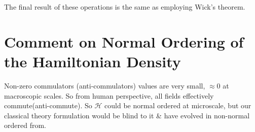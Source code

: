 The final result of these operations is the same as employing Wick's theorem.

\section{Comment on Normal Ordering of the Hamiltonian Density}
Non-zero commulators (anti-commulators) values are very small, $\approx0$ at macroscopic scales. So from human perspective, all fields effectively commute(anti-commute). So $\mathcal{H}$ could be normal ordered at microscale, but our classical theory formulation would be blind to it \& have evolved in non-normal ordered from.